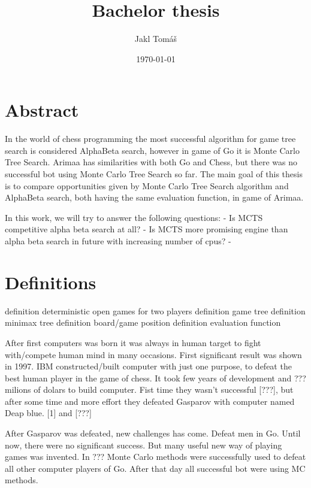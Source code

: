 \documentclass[12pt,titlepage,fleqn]{report}
\title{Bachelor thesis}
\author{Jakl Tomáš}
\date{\today}
\begin{document}
\maketitle
\tableofcontents
\newpage

\section{Abstract}
In the world of chess programming the most successful algorithm for game tree
search is considered AlphaBeta search, however in game of Go it is Monte
Carlo Tree Search. Arimaa has similarities with both Go and Chess, but there
was no successful bot using Monte Carlo Tree Search so far. The main goal of
this thesis is to compare opportunities given by Monte Carlo Tree Search
algorithm and AlphaBeta search, both having the same evaluation function, in
game of Arimaa.



In this work, we will try to answer the following questions:
- Is MCTS competitive alpha beta search at all?
- Is MCTS more promising engine than alpha beta search in future with
  increasing number of cpus?
- 

\section{Definitions}
definition deterministic open games for two players
definition game tree
definition minimax tree
definition board/game position
definition evaluation function

After first computers was born it was always in human target to fight
with/compete human mind in many occasions. First significant result was shown
in 1997. IBM constructed/built computer with just one purpose, to defeat
the best human player in the game of chess. It took few years of development
and ??? milions of dolars to build computer. Fist time they wasn't successful
[???], but after some time and more effort they defeated Gasparov with computer
named Deap blue.
[1] and [???]

After Gasparov was defeated, new challenges has come. Defeat men in Go. Until
now, there were no significant success. But many useful new way of playing
games was invented. In ??? Monte Carlo methods were successfully used to
defeat all other computer players of Go. After that day all successful bot
were using MC methods.
\end{document}
